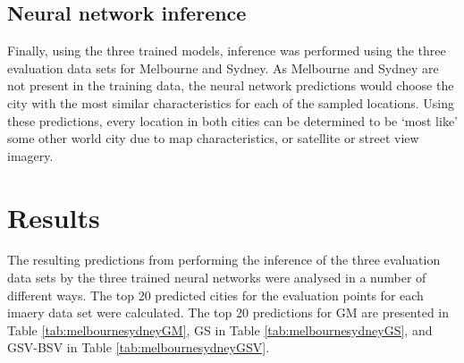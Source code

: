 \documentclass[sageh,times]{sagej}
\begin{document}
\subsection{Neural network inference}\label{sec:methods5}    
Finally, using the three trained models, inference was performed using the three evaluation data sets for Melbourne and Sydney. As Melbourne and Sydney are not present in the training data, the neural network predictions would choose the city with the most similar characteristics for each of the sampled locations. Using these predictions, every location in both cities can be determined to be `most like' some other world city due to map characteristics, or satellite or street view imagery.





\section{Results}\label{sec:results}
The resulting predictions from performing the inference of the three evaluation data sets by the three trained neural networks were analysed in a number of different ways. The top 20 predicted cities for the evaluation points for each imaery data set were calculated. The top 20 predictions for GM are presented in Table \ref{tab:melbournesydneyGM}, GS in Table \ref{tab:melbournesydneyGS}, and GSV-BSV in Table \ref{tab:melbournesydneyGSV}.
\end{document}
